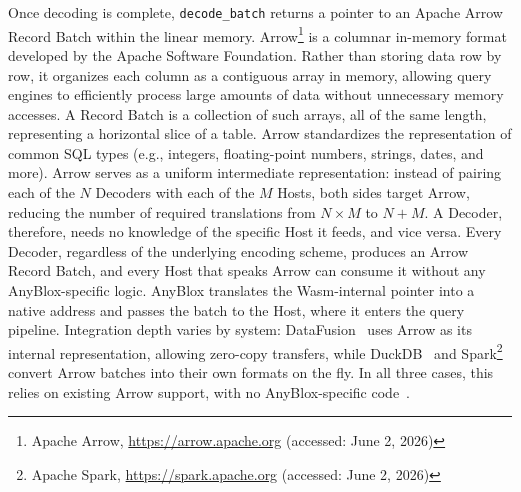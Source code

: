 Once decoding is complete, \texttt{decode\_batch} returns a pointer to an Apache Arrow Record Batch within the linear memory. Arrow\footnote{Apache Arrow, \url{https://arrow.apache.org} (accessed: June 2, 2026)} is a columnar in-memory format developed by the Apache Software Foundation. Rather than storing data row by row, it organizes each column as a contiguous array in memory, allowing query engines to efficiently process large amounts of data without unnecessary memory accesses. A Record Batch is a collection of such arrays, all of the same length, representing a horizontal slice of a table. Arrow standardizes the representation of common SQL types (e.g., integers, floating-point numbers, strings, dates, and more). Arrow serves as a uniform intermediate representation: instead of pairing each of the $N$ Decoders with each of the $M$ Hosts, both sides target Arrow, reducing the number of required translations from $N \times M$ to $N + M$. A Decoder, therefore, needs no knowledge of the specific Host it feeds, and vice versa. Every Decoder, regardless of the underlying encoding scheme, produces an Arrow Record Batch, and every Host that speaks Arrow can consume it without any AnyBlox-specific logic. AnyBlox translates the Wasm-internal pointer into a native address and passes the batch to the Host, where it enters the query pipeline. Integration depth varies by system: DataFusion~\cite{lambApacheArrowDataFusion2024} uses Arrow as its internal representation, allowing zero-copy transfers, while DuckDB~\cite{raasveldtDuckDBEmbeddableAnalytical2019} and Spark\footnote{Apache Spark, \url{https://spark.apache.org} (accessed: June 2, 2026)} convert Arrow batches into their own formats on the fly. In all three cases, this relies on existing Arrow support, with no AnyBlox-specific code~\cite{gienieczkoAnyBloxFrameworkSelfDecoding2025}.